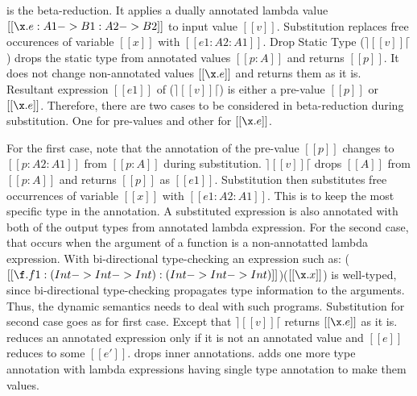  is the beta-reduction. It applies a dually
annotated lambda value $[[\x.e : A1 -> B1 : A2 -> B2]]$ to input
value $[[v]]$. Substitution replaces free occurences of variable
$[[x]]$ with $[[e1:A2:A1]]$.
Drop Static Type ($\rceil[[v]]\lceil$) drops the static type
from annotated values $[[p:A]]$ and returns $[[p]]$.
It does not change non-annotated values $[[\x.e]]$ and returns 
them as it is. Resultant expression $[[e1]]$ of ($\rceil[[v]]\lceil$)
is either a pre-value $[[p]]$ or $[[\x.e]]$.
Therefore, there are two cases to be considered in beta-reduction
during substitution. One for pre-values and other for $[[\x.e]]$.

For the first case, note that the annotation of the pre-value
$[[p]]$ changes to $[[p:A2:A1]]$ from $[[p:A]]$ during substitution.
$\rceil[[v]]\lceil$ drops $[[A]]$ from $[[p:A]]$ and returns $[[p]]$ 
as $[[e1]]$. Substitution then
substitutes free occurrences of variable $[[x]]$ with $[[e1:A2:A1]]$.
This is to keep the most specific type in the annotation. A substituted
expression is also annotated with both of the output types from
annotated lambda expression.
For the second case, that occurs when the
argument of a function is a non-annotatted lambda expression.
With bi-directional type-checking an expression such as:
($[[\f.f 1:(Int -> Int -> Int) : (Int -> Int -> Int)]]$)($[[\x.x]]$)
 
is well-typed, since bi-directional type-checking propagates
type information to the arguments. Thus, the dynamic semantics
needs to deal with such programs. Substitution for second case goes
as for first case. Except that $\rceil[[v]]\lceil$ returns $[[\x.e]]$ as it is.
reduces an annotated expression only if it is not an annotated value and $[[e]]$
reduces to some $[[e']]$.  drops inner
annotations.  adds one more type annotation with
lambda expressions having single type annotation to make them values.

